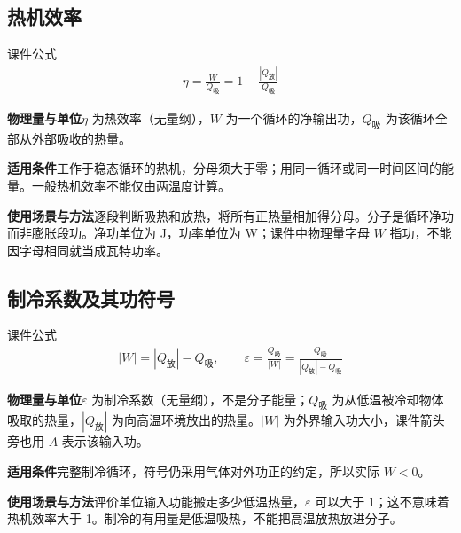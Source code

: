 \documentclass[UTF8,fontset=none,zihao=-4,a4paper]{ctexart}
\newcommand{\explain}[3]{\par\noindent\textbf{物理量与单位}\quad #1\par
\noindent\textbf{适用条件}\quad #2\par
\noindent\textbf{使用场景与方法}\quad #3\par}
\begin{document}
\par\noindent\begin{minipage}{\linewidth}
\subsection{热机效率}
\begin{infobox}[breakable=false]{课件公式}
\begin{gather*}\eta=\frac W{Q_{\text{吸}}}=1-\frac{|Q_{\text{放}}|}{Q_{\text{吸}}}\end{gather*}
\end{infobox}
\end{minipage}\par
\explain{$\eta$ 为热效率（无量纲），$W$ 为一个循环的净输出功，$Q_{\text{吸}}$ 为该循环全部从外部吸收的热量。}{工作于稳态循环的热机，分母须大于零；用同一循环或同一时间区间的能量。一般热机效率不能仅由两温度计算。}{逐段判断吸热和放热，将所有正热量相加得分母。分子是循环净功而非膨胀段功。净功单位为 J，功率单位为 W；课件中物理量字母 $W$ 指功，不能因字母相同就当成瓦特功率。}


\par\noindent\begin{minipage}{\linewidth}
\subsection{制冷系数及其功符号}
\begin{infobox}[breakable=false]{课件公式}
\begin{gather*}|W|=|Q_{\text{放}}|-Q_{\text{吸}},\qquad\varepsilon=\frac{Q_{\text{吸}}}{|W|}=\frac{Q_{\text{吸}}}{|Q_{\text{放}}|-Q_{\text{吸}}}\end{gather*}
\end{infobox}
\end{minipage}\par
\explain{$\varepsilon$ 为制冷系数（无量纲），不是分子能量；$Q_{\text{吸}}$ 为从低温被冷却物体吸取的热量，$|Q_{\text{放}}|$ 为向高温环境放出的热量。$|W|$ 为外界输入功大小，课件箭头旁也用 $A$ 表示该输入功。}{完整制冷循环，符号仍采用气体对外功正的约定，所以实际 $W<0$。}{评价单位输入功能搬走多少低温热量，$\varepsilon$ 可以大于 1；这不意味着热机效率大于 1。制冷的有用量是低温吸热，不能把高温放热放进分子。}
\end{document}
